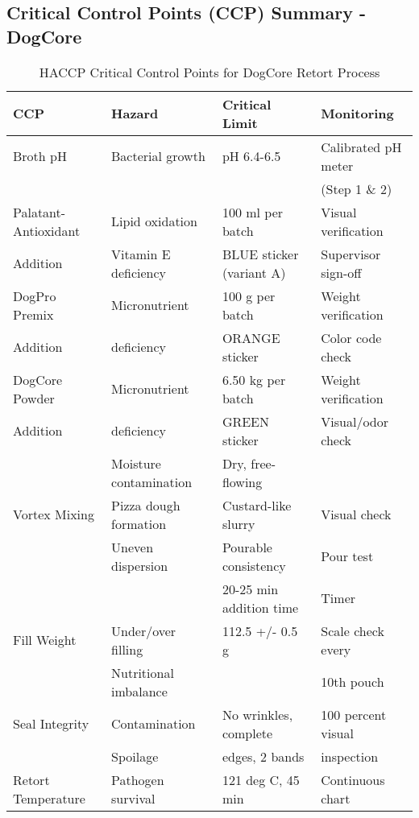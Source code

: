 
\subsection*{Critical Control Points (CCP) Summary - DogCore}

\begin{table}[h]
\centering
\caption{HACCP Critical Control Points for DogCore Retort Process}
\label{tab:ccp_dogcore}
\begin{tabular}{@{}llll@{}}
\toprule
\textbf{CCP} & \textbf{Hazard} & \textbf{Critical Limit} & \textbf{Monitoring} \\
\midrule
Broth pH & Bacterial growth & pH 6.4-6.5 & Calibrated pH meter \\
 & & & (Step 1 \& 2) \\
\midrule
Palatant-Antioxidant & Lipid oxidation & 100 ml per batch & Visual verification \\
Addition & Vitamin E deficiency & BLUE sticker (variant A) & Supervisor sign-off \\
\midrule
DogPro Premix & Micronutrient & 100 g per batch & Weight verification \\
Addition & deficiency & ORANGE sticker & Color code check \\
\midrule
DogCore Powder & Micronutrient & 6.50 kg per batch & Weight verification \\
Addition & deficiency & GREEN sticker & Visual/odor check \\
 & Moisture contamination & Dry, free-flowing & \\
\midrule
Vortex Mixing & Pizza dough formation & Custard-like slurry & Visual check \\
 & Uneven dispersion & Pourable consistency & Pour test \\
 & & 20-25 min addition time & Timer \\
\midrule
Fill Weight & Under/over filling & 112.5 +/- 0.5 g & Scale check every \\
 & Nutritional imbalance & & 10th pouch \\
\midrule
Seal Integrity & Contamination & No wrinkles, complete & 100 percent visual \\
 & Spoilage & edges, 2 bands & inspection \\
\midrule
Retort Temperature & Pathogen survival & 121 deg C, 45 min & Continuous chart \\

\end{tabular}
\end{table}
